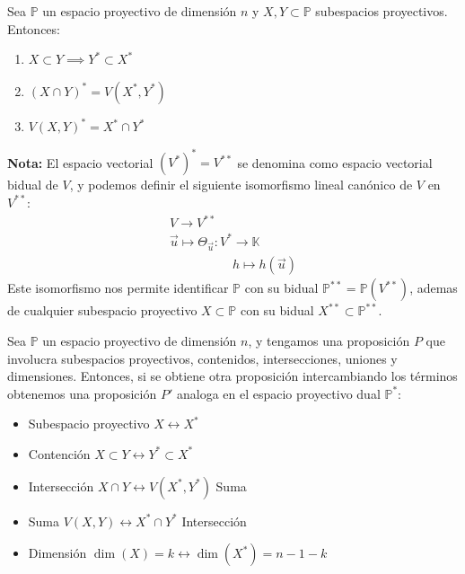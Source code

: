 \begin{proposición}
    Sea $\mathbb{P}$ un espacio proyectivo de dimensión $n$ y $X, Y \subset \mathbb{P}$ subespacios proyectivos. Entonces:
    \begin{enumerate}
        \item $X \subset Y \implies Y^* \subset X^*$
        \item $(X \cap Y)^* = V(X^*, Y^*)$
        \item $V(X, Y)^* = X^* \cap Y^*$
    \end{enumerate}
\end{proposición}

\textbf{Nota: } El espacio vectorial $(V^*)^*=V^{**}$ se denomina como espacio vectorial bidual de $V$, y podemos definir el siguiente isomorfismo lineal canónico de $V$ en $V^{**}$:
\[
    \begin{matrix}
        V \to  V^{**} \\
        \vec{u} \mapsto  \Theta_{\vec{u}} : V^* \to \mathbb{K} \\
        \qquad \qquad \quad h \mapsto h(\vec{u})
    \end{matrix}
\]
Este isomorfismo nos permite identificar $\mathbb{P}$ con su bidual $\mathbb{P}^{**} = \mathbb{P}(V^{**})$, ademas de cualquier subespacio proyectivo $X \subset \mathbb{P}$ con su bidual $X^{**} \subset \mathbb{P}^{**}$.

\begin{proposición}
    Sea $\mathbb{P}$ un espacio proyectivo de dimensión $n$, y tengamos una proposición $P$ que involucra subespacios proyectivos, contenidos, intersecciones, uniones y dimensiones. Entonces, si se obtiene otra proposición intercambiando los términos obtenemos una proposición $P'$ analoga en el espacio proyectivo dual $\mathbb{P}^*$:
    \begin{itemize}
        \item Subespacio proyectivo $X \leftrightarrow X^*$
        \item Contención $X \subset Y \leftrightarrow Y^* \subset X^*$
        \item Intersección $X \cap Y \leftrightarrow V(X^*, Y^*)$ Suma
        \item Suma $V(X, Y) \leftrightarrow X^* \cap Y^*$ Intersección
        \item Dimensión $\dim(X) = k \leftrightarrow\dim(X^*) = n - 1 - k$
    \end{itemize}
\end{proposición}

